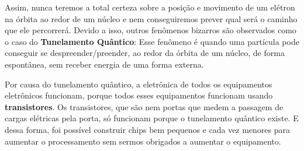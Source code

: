 \documentclass[12pt]{extarticle}
\newcommand{\<}{\langle}
\renewcommand{\>}{\rangle}
\theoremstyle{definition}
\begin{document}
Assim, nunca teremos a total certeza sobre a posição e movimento de um elétron na órbita ao redor de um núcleo e nem conseguiremos prever qual será o caminho que ele percorrerá. Devido a isso, outros fenômenos bizarros são observados como o caso do \textbf{Tunelamento Quântico}: Esse fenômeno é quando uma partícula pode conseguir se despreender/preender, ao redor da órbita de um núcleo, de forma espontânea, sem receber energia de uma forma externa.

Por causa do tunelamento quântico, a eletrônica de todos os equipamentos eletrônicos funcionam, porque todos esses equipamentos funcionam usando \textbf{transistores}. Os transistores, que são nem portas que medem a passagem de cargas elétricas pela porta, só funcionam porque o tunelamento quântico existe. E dessa forma, foi possível construir chips bem pequenos e cada vez menores para aumentar o processamento sem sermos obrigados a aumentar o equipamento.
\end{document}
